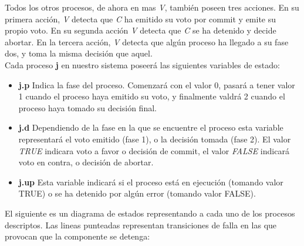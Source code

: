 \documentclass[titlepage, 12pt]{book}
\begin{document}
Todos los otros procesos, de ahora en mas \textit{V}, también poseen tres acciones. En su primera acción, \textit{V} detecta que \textit{C} ha emitido su voto por commit y emite su propio voto. En su segunda acción \textit{V} detecta que \textit{C} se ha detenido y decide abortar. En la tercera acción, \textit{V} detecta que algún proceso ha llegado a su fase dos, y toma la misma decisión que aquel.\\

Cada proceso \textbf{j} en nuestro sistema poseerá las siguientes variables de estado:
\begin{itemize}
\item \textbf{j.p} Indica la fase del proceso. Comenzará con el valor 0, pasará a tener valor 1 cuando el proceso haya emitido su voto, y finalmente valdrá 2 cuando el proceso haya tomado su decisión final.
\item \textbf{j.d} Dependiendo de la fase en la que se encuentre el proceso esta variable representará el voto emitido (fase 1), o la decisión tomada (fase 2). El valor \textit{TRUE} indicara voto a favor o decisión de commit, el valor \textit{FALSE} indicará voto en contra, o decisión de abortar.
\item \textbf{j.up} Esta variable indicará si el proceso está en ejecución (tomando valor TRUE) o se ha detenido por algún error (tomando valor FALSE).
\end{itemize}

El siguiente es un diagrama de estados representando a cada uno de los procesos descriptos. Las lineas punteadas representan transiciones de falla en las que provocan que la componente se detenga:

\end{document}
